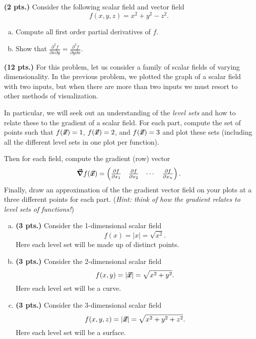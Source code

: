 \documentclass[12pt]{article} %
\begin{document}
\vspace*{0.5cm}

\begin{problem}
\textbf{(2 pts.)} Consider the following scalar field and vector field
\[
f(x,y,z) = x^2+y^2-z^2.
\]
\begin{enumerate}[(a)]
    \item Compute all first order partial derivatives of $f$.
    \item Show that $\frac{\partial^2 f}{\partial x \partial y} = \frac{\partial^2 f}{\partial y \partial x}$.
\end{enumerate}
\end{problem}

\vspace*{0.5cm}

\begin{problem}
\textbf{(12 pts.)} For this problem, let us consider a family of scalar fields of varying dimensionality. In the previous problem, we plotted the graph of a scalar field with two inputs, but when there are more than two inputs we must resort to other methods of visualization.

In particular, we will seek out an understanding of the \emph{level sets} and how to relate these to the gradient of a scalar field. For each part, compute the set of points such that $f(\boldsymbol{\vec{x}})=1$, $f(\boldsymbol{\vec{x}})=2$, and $f(\boldsymbol{\vec{x}})=3$ and plot these sets (including all the different level sets in one plot per function).

Then for each field, compute the gradient (row) vector
\[
\boldsymbol{\vec{\nabla}} f(\boldsymbol{\vec{x}}) = \begin{pmatrix} \frac{\partial f}{\partial x_1} & \frac{\partial f}{\partial x_2} & \cdots & \frac{\partial f}{\partial x_n}\end{pmatrix}.
\]
Finally, draw an approximation of the the gradient vector field on your plots at a three different points for each part. (\emph{Hint: think of how the gradient relates to level sets of functions!})
\begin{enumerate}[(a)]
	\item \textbf{(3 pts.)} Consider the 1-dimensional scalar field
	\[
	f(x) = |x| = \sqrt{x^2}.
	\]
	Here each level set will be made up of distinct points.
	\item \textbf{(3 pts.)} Consider the 2-dimensional scalar field
	\[
	f(x,y) = |\boldsymbol{\vec{x}}| = \sqrt{x^2+y^2}.
	\]
	Here each level set will be a curve.
	\item \textbf{(3 pts.)} Consider the 3-dimensional scalar field
		\[
		f(x,y,z) = |\boldsymbol{\vec{x}}| = \sqrt{x^2+y^2+z^2}.
		\]
		Here each level set will be a surface.
\end{enumerate}
\end{problem}
\end{document}
